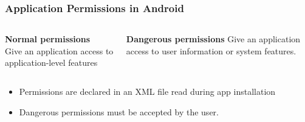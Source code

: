 \documentclass{beamer}
\begin{document}
		\begin{frame}
		\frametitle{Application Permissions in Android}
\begin{center}

			\begin{columns}[t]
			\begin{column}[T]{5cm}
			 \textbf{Normal permissions}
			 \\Give an application access to application-level features 
			\end{column}
			\begin{column}[T]{5cm}
			\textbf{Dangerous permissions}
			Give an application access to user information or system features.
			\end{column}
				
			\end{columns}
			\vspace{.25cm}
						\begin{itemize}
			\item Permissions are declared in an XML file read during app installation
			\item Dangerous permissions must be accepted by the user.
			\end{itemize}
			\end{center}
		\end{frame}
		
\end{document}

